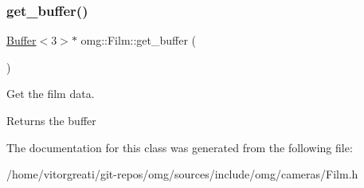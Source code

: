 \subsubsection{\texorpdfstring{get\_buffer()}{get\_buffer()}}
{\footnotesize\ttfamily \mbox{\hyperlink{classomg_1_1_buffer}{Buffer}}$<$3$>$$\ast$ omg\+::\+Film\+::get\+\_\+buffer (\begin{DoxyParamCaption}{ }\end{DoxyParamCaption})\hspace{0.3cm}{\ttfamily [inline]}}



Get the film data. 

\begin{DoxyReturn}{Returns}
the buffer 
\end{DoxyReturn}


The documentation for this class was generated from the following file\+:\begin{DoxyCompactItemize}
\item 
/home/vitorgreati/git-\/repos/omg/sources/include/omg/cameras/Film.\+h\end{DoxyCompactItemize}
